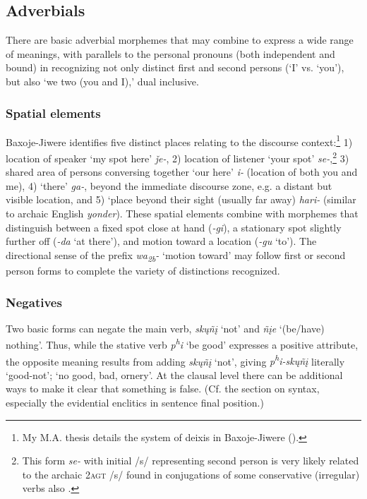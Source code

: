 \documentclass[output=paper]{LSP/langsci}
\begin{document}
\subsection{Adverbials}
There are basic adverbial morphemes that may combine to express a wide range of meanings, with parallels to the personal pronouns (both independent and bound) in recognizing not only distinct first and second persons (`I' vs. `you'), but also `we two (you and I),' dual inclusive.  

\subsubsection{Spatial elements}   

Baxoje-Jiwere identifies five distinct places relating to the discourse context:\footnote{My M.A. thesis details the system of deixis in Baxoje-Jiwere (\citealt{Hopkins1988}).} 1) location of speaker `my spot here' \textit{\v{j}e-},  2) location of  listener `your spot' \textit{se-},\footnote{This form \textit{se-} with initial /s/ representing second person is very likely related to the archaic \textsc{2agt} /s/ found in conjugations of some conservative (irregular) verbs also \citep[480]{Rankin2005}.}  3) shared area of persons conversing together `our here' \textit{i-} (location of both you and me),  4) `there' \textit{ga-}, beyond the immediate discourse zone, e.g. a distant but visible location, and 5) `place beyond their sight (usually far away) \textit{hari-} (similar to archaic English \textit{yonder}).  These spatial elements combine with morphemes that distinguish between a fixed spot close at hand (\textit{-gi}), a stationary spot slightly further off (\textit{-da} `at there'), and motion toward a location (\textit{-gu} `to').  The directional sense of the prefix \textit{wa\textsubscript{2b}-} `motion toward' may follow first or second person forms to complete the variety of distinctions recognized. 
	
\subsubsection{Negatives} 

 Two basic forms can negate the main verb, \textit{sk\k{u}\~n\k{i}} `not' and \textit{\~n\k{i}e} `(be/have) nothing'.  Thus, while the stative verb \textit{p\textsuperscript{h}i} `be good' expresses a positive attribute, the opposite meaning results from adding \textit{sk\k{u}\~n\k{i}} `not', giving \textit{p\textsuperscript{h}i-sk\k{u}\~n\k{i}}  literally `good-not'; `no good, bad, ornery'.  At the clausal level there can be additional ways to make it clear that something is false.  (Cf. the section on syntax, especially the evidential enclitics in sentence final position.)  
\end{document}
